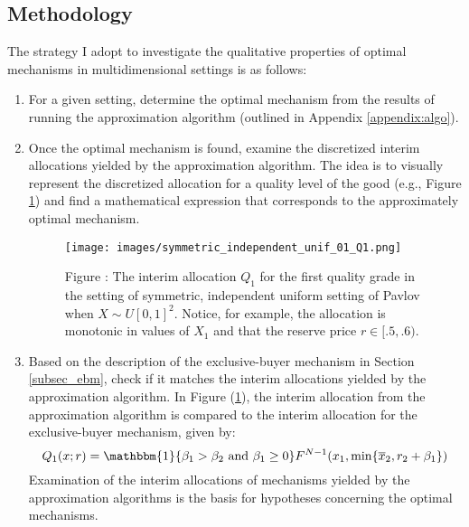 \subsection{Methodology}\label{subsec_method}


The strategy I adopt to investigate the qualitative properties of optimal mechanisms in multidimensional settings is as follows:

\begin{enumerate}
    \item For a given setting, determine the optimal mechanism from the results of running the approximation algorithm (outlined in Appendix \ref{appendix:algo}).

    \item Once the optimal mechanism is found, examine the discretized interim allocations yielded by the approximation algorithm. The idea is to visually represent the discretized allocation for a quality level of the good (e.g., Figure \ref{fig:belloni_n2_q1}) and find a mathematical expression that corresponds to the approximately optimal mechanism.

    \begin{figure}[H]
        \begin{center}
        \texttt{[image: images/symmetric\_independent\_unif\_01\_Q1.png]}
        \end{center}
        
        \vspace{1mm}
        \raggedright{\small {\sc Figure \thefig\label{fig:belloni_n2_q1}:} The interim allocation $Q_1$ for the first quality grade in the setting of symmetric, independent uniform setting of Pavlov \autocite*{pavlov2011optimal} when $X \sim U[0,1]^2$. Notice, for example, the allocation is monotonic in values of $X_1$ and that the reserve price $r \in [.5, .6)$.}
    \end{figure}

    \item Based on the description of the exclusive-buyer mechanism in Section \ref{subsec_ebm}, check if it matches the interim allocations yielded by the approximation algorithm. In Figure (\ref{fig:belloni_n2_q1}), the interim allocation from the approximation algorithm is compared to the interim allocation for the exclusive-buyer mechanism, given by: 
    \begin{equation}
        Q_1(x;r) = \mathbbm{1}\{ \beta_1 > \beta_2 \text{ and } \beta_1 \geq 0 \}F^{N-1}(x_1, \min\{\overline{x}_2, r_2 + \beta_1\})
    \end{equation}
    \noindent Examination of the interim allocations of mechanisms yielded by the approximation algorithms is the basis for hypotheses concerning the optimal mechanisms.
\end{enumerate}

